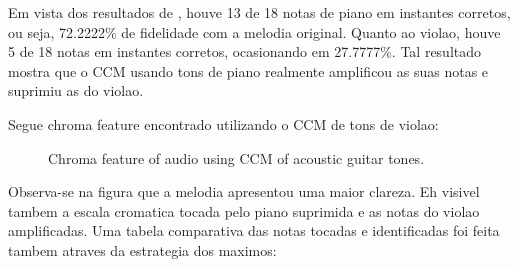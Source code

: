 \documentclass{article}
\begin{document}
	
	Em vista dos resultados de , houve 13 de 18 notas de piano em instantes corretos, ou seja, 72.2222\% de fidelidade com a melodia original. Quanto ao violao, houve 5 de 18 notas em instantes corretos, ocasionando em 27.7777\%. Tal resultado mostra que o CCM usando tons de piano realmente amplificou as suas notas e suprimiu as do violao.



Segue chroma feature encontrado utilizando o CCM de tons de violao:
	
	\begin{figure}[h]
	 \centerline{}
	 \caption{Chroma feature of audio using CCM of acoustic guitar tones.}
	 \label{fig:2-ccm-violao}
	\end{figure}	

	Observa-se na figura  que a melodia apresentou uma maior clareza. Eh visivel tambem a escala cromatica tocada pelo piano suprimida e as notas do violao amplificadas. Uma tabela comparativa das notas tocadas e identificadas foi feita tambem atraves da estrategia dos maximos:
\end{document}
